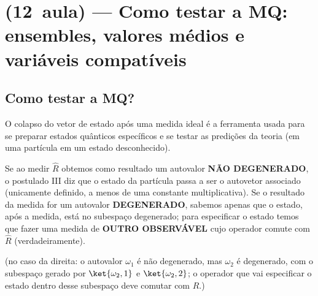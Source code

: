 \section*{(12\textordfeminine\ aula) --- Como testar a MQ: ensembles, valores médios e variáveis compatíveis}

\subsection*{Como testar a MQ?}

O colapso do vetor de estado após uma medida ideal é a ferramenta usada para se preparar estados quânticos específicos e se testar as predições da teoria (em uma partícula em um estado desconhecido).

Se ao medir $\hat{R}$ obtemos como resultado um autovalor \textbf{NÃO DEGENERADO}, o postulado III diz que o estado da partícula passa a ser o autovetor associado (unicamente definido, a menos de uma constante multiplicativa). Se o resultado da medida for um autovalor \textbf{DEGENERADO}, sabemos apenas que o estado, após a medida, está no subespaço degenerado; para especificar o estado temos que fazer uma medida de \textbf{OUTRO OBSERVÁVEL} cujo operador comute com $\hat{R}$ (verdadeiramente).

\begin{center}
\end{center}

\noindent (no caso da direita: o autovalor $\omega_1$ é não degenerado, mas $\omega_2$ é degenerado, com o subespaço gerado por $\ket{\omega_2,1}$ e $\ket{\omega_2,2}$; o operador que vai especificar o estado dentro desse subespaço deve comutar com $\hat{R}$.)

